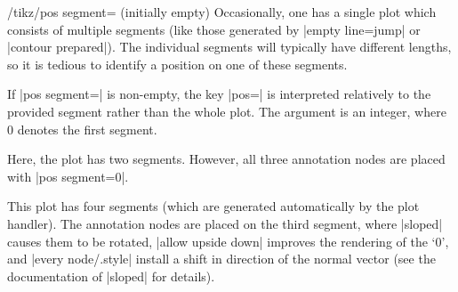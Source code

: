 {\begin{key}{/tikz/pos segment= (initially empty)}
	Occasionally, one has a single plot which consists of multiple segments (like those generated by |empty line=jump| or |contour prepared|). The individual segments will typically have different lengths, so it is tedious to identify a position on one of these segments.

	If |pos segment=| is non-empty, the key |pos=| is interpreted relatively to the provided segment rather than the whole plot. The argument  is an integer, where $0$ denotes the first segment.
\begin{codeexample}[]
\end{codeexample}
	Here, the plot has two segments. However, all three annotation nodes are placed with |pos segment=0|.

\pgfplotsexpensiveexample
\begin{codeexample}[]
\end{codeexample}
	This plot has four segments (which are generated automatically by the plot handler). The annotation nodes are placed
	on the third segment, where |sloped| causes them to be rotated, |allow upside down| improves the rendering of the `$0$', and |every node/.style| install a shift in direction of the normal vector (see the documentation of |sloped| for details).
\end{key}


}

